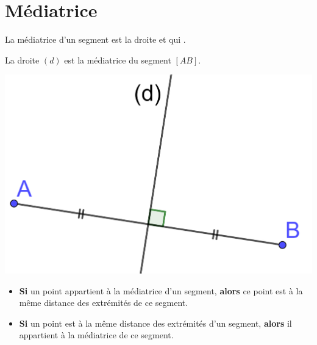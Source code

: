 \documentclass[12pt,a4paper]{article}
\date{}
\title{}
\begin{document}







\section{Médiatrice}


\begin{mydef}
	La médiatrice d'un segment est la droite  et qui .
\end{mydef}


\begin{myex}
	La droite $(d)$ est la médiatrice du segment $[AB]$.
	
	\begin{center}
		\includegraphics[scale=0.15]{med1}
	\end{center}
\end{myex}

\begin{myprops}
	\begin{itemize}
		\item \textbf{Si} un point appartient à la médiatrice d'un segment, \textbf{alors} ce point est à la même distance des extrémités de ce segment.
		\item \textbf{Si} un point est à la même distance des extrémités d'un segment, \textbf{alors} il appartient à la médiatrice de ce segment.
	\end{itemize}
\end{myprops}
\end{document}
